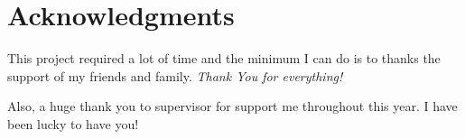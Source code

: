 \chapter*{Acknowledgments}

This project required a lot of time and the minimum I can do is to thanks the support of my friends and family. \emph{Thank You for everything!}

Also, a huge thank you to supervisor \textbf{\myProfTitle} \textbf{\myProfFirstName} \textbf{\myProfLastName} for support me throughout this year. I have been lucky to have you!

